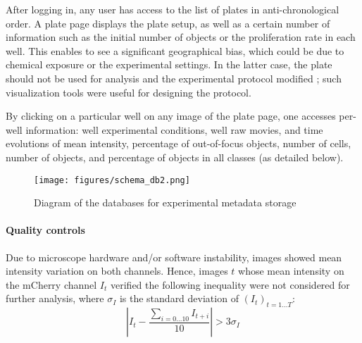 After logging in, any user has access to the list of plates in anti-chronological order. A plate page displays the plate setup, as well as a certain number of information such as the initial number of objects or the proliferation rate in each well. This enables to see a significant geographical bias, which could be due to chemical exposure or the experimental settings. In the latter case, the plate should not be used for analysis and the experimental protocol modified ; such visualization tools were useful for designing the protocol. 

By clicking on a particular well on any image of the plate page, one accesses per-well information: well experimental conditions, well raw movies, and time evolutions of mean intensity, percentage of out-of-focus objects, number of cells, number of objects, and percentage of objects in all classes (as detailed below).

\begin{figure}
\centering
\texttt{[image: figures/schema\_db2.png]}
\caption{Diagram of the databases for experimental metadata storage}
\label{db}
\end{figure}


\paragraph{Quality controls}
Due to microscope hardware and/or software instability, images showed mean intensity variation on both channels. Hence, images $t$ whose mean intensity on the mCherry channel $I_t$ verified the following inequality were not considered for further analysis, where $\sigma_I $ is the standard deviation of $(I_t)_{t=1\ldots T}$:
\[ |I_t- \dfrac{\sum_{i=0\ldots 10} I_{t+i} }{10}| > 3\sigma_I  \]

